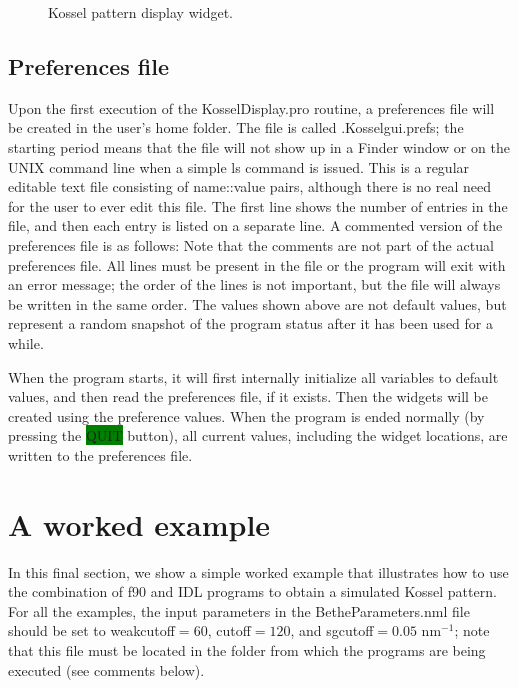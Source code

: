 \documentclass[DIV=calc, paper=letter, fontsize=11pt]{scrartcl}	 %
\newcommand{\button}[1]{\colorbox{green}{\textsf{#1}} button}
\begin{document}
\begin{figure}[h]
\leavevmode\centering{}
\caption{\label{fig:widget2}Kossel pattern display widget.}
\end{figure}

\subsection{Preferences file\label{sec:idlpref}}
Upon the first execution of the \textsf{KosselDisplay.pro} routine, a preferences file will be created in the user's home folder.  
The file is called \textsf{.Kosselgui.prefs}; the starting period
means that the file will not show up in a Finder window or on the UNIX command line when a simple \textsf{ls} command is issued.  This is a 
regular editable text file consisting of name::value pairs, although there is no real
need for the user to ever edit this file.  The first line shows the number of entries in the file, and then each entry is listed on a 
separate line.  A commented version of the preferences file is as follows:
Note that the comments are not part of the actual preferences file.  All lines must be present in the file or the program will exit with an error message; the order 
of the lines is not important, but the file will always be written in the same order.
The values shown above are not default values, but represent a random snapshot of the program status after it has been used for a while.

When the program starts, it will first internally initialize all variables to default values, and then read the preferences
file, if it exists.  Then the widgets will be created using the preference values.  When the program is ended normally (by
pressing the \button{QUIT}), all current values, including the widget locations, are written to the preferences
file.

\newpage
\section{A worked example\label{sec:examples}}
In this final section, we show a simple worked example that illustrates how to use the combination of f90 and IDL programs 
to obtain a simulated Kossel pattern.  For all the examples, the input parameters in the \textsf{BetheParameters.nml} file 
should be set to \textsf{weakcutoff}$= 60$, \textsf{cutoff}$= 120$, and \textsf{sgcutoff}$=0.05$ nm$^{-1}$; note that this 
file must be located in the folder from which the programs are being executed (see comments below).
\end{document}
